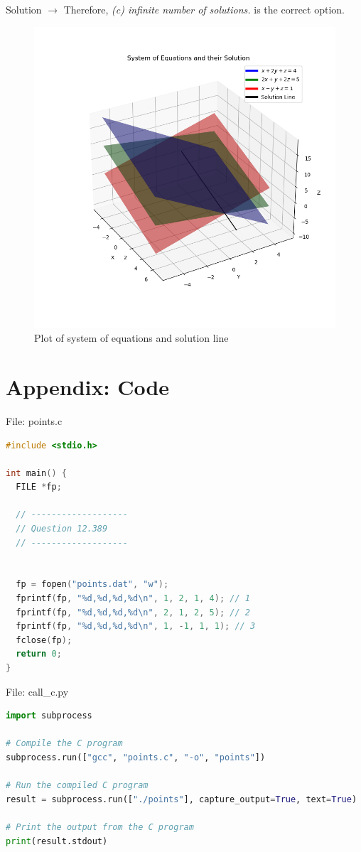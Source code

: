 \documentclass{beamer}
\numberwithin{equation}{section}
\theoremstyle{remark}
\begin{document}
\begin{frame}{Solution}
$\rightarrow$ Therefore, \textit{(c) infinite number of solutions.} is the correct option.
\begin{figure}[h!]
   \centering
   \includegraphics[width=0.6\linewidth]{figs/01.png}
   \caption{Plot of system of equations and solution line}
   \label{Plot_1}
\end{figure}
\end{frame}
\section*{Appendix: Code}

\begin{frame}[fragile]{File: points.c}
\begin{lstlisting}[language=C]
#include <stdio.h>

int main() {
  FILE *fp;

  // -------------------
  // Question 12.389
  // -------------------


  fp = fopen("points.dat", "w");
  fprintf(fp, "%d,%d,%d,%d\n", 1, 2, 1, 4); // 1
  fprintf(fp, "%d,%d,%d,%d\n", 2, 1, 2, 5); // 2
  fprintf(fp, "%d,%d,%d,%d\n", 1, -1, 1, 1); // 3
  fclose(fp);
  return 0;
}
\end{lstlisting}
\end{frame}

\begin{frame}[fragile]{File: call\_c.py}
\begin{lstlisting}[language=Python]
import subprocess

# Compile the C program
subprocess.run(["gcc", "points.c", "-o", "points"])

# Run the compiled C program
result = subprocess.run(["./points"], capture_output=True, text=True)

# Print the output from the C program
print(result.stdout)
\end{lstlisting}
\end{frame}
\end{document}

